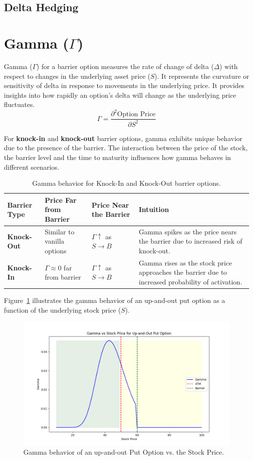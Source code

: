 \subsection{Delta Hedging}

\section{Gamma (\(\Gamma\))}

Gamma (\(\Gamma\)) for a barrier option measures the rate of change of delta (\(\Delta\)) with respect to changes in the underlying asset price (\(S\)). It represents the curvature or sensitivity of delta in response to movements in the underlying price. It provides insights into how rapidly an option's delta will change as the underlying price fluctuates.
\[
\Gamma = \frac{\partial^2 \text{Option Price}}{\partial S^2}
\]

For \textbf{knock-in} and \textbf{knock-out} barrier options, gamma exhibits unique behavior due to the presence of the barrier. The interaction between the price of the stock, the barrier level and the time to maturity influences how gamma behaves in different scenarios.
\begin{table}[htbp]
\centering
\begin{tabularx}{\textwidth}{|X|X|X|X|}
\hline
\textbf{Barrier Type}         & \textbf{Price Far from Barrier} & \textbf{Price Near the Barrier} & \textbf{Intuition}                              \\ 
\hline
\textbf{Knock-Out} & Similar to vanilla options     & $\Gamma \uparrow$ as $S \to B$  & Gamma spikes as the price nears the barrier due to increased risk of knock-out. \\ 
\hline
\textbf{Knock-In}    & $\Gamma \approx 0$ far from barrier   & $\Gamma \uparrow$ as $S \to B$  & Gamma rises as the stock price approaches the barrier due to increased probability of activation. \\ 
\hline
\end{tabularx}
\caption{Gamma behavior for Knock-In and Knock-Out barrier options.}
\label{tab:gamma_barrier_options}
\end{table}


Figure~\ref{fig:gamma_behavior} illustrates the gamma behavior of an up-and-out put option as a function of the underlying stock price (\(S\)). 

\begin{figure}[h]
    \centering
    \includegraphics[width=.65\linewidth]{content/images/gamma.png}
    \caption{Gamma behavior of an up-and-out Put Option vs. the Stock Price.}
    \label{fig:gamma_behavior}
\end{figure}

